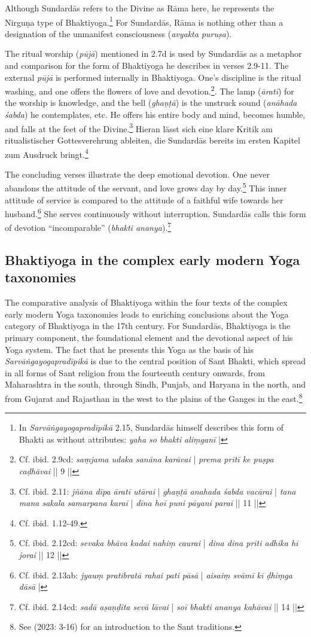 Although Sundardās refers to the Divine as Rāma here, he represents the Nirguṇa type of Bhaktiyoga.\footnote{In \textit{Sarvāṅgayogapradīpikā} 2.15, Sundardās himself describes this form of Bhakti as without attributes: \textit{yaha so bhakti aliṃganī} |} For Sundardās, Rāma is nothing other than a designation of the unmanifest consciousness (\textit{avyakta puruṣa}).

The ritual worship (\textit{pūjā}) mentioned in 2.7d is used by Sundardās as a metaphor and comparison for the form of Bhaktiyoga he describes in verses 2.9-11. The external \textit{pūjā} is performed internally in Bhaktiyoga. One's discipline is the ritual washing, and one offers the flowers of love and devotion.\footnote{Cf. ibid. 2.9cd: \textit{saṃjama udaka sanāna karāvai} | \textit{prema prītī ke puṣpa caḍhāvai} || 9 ||}. The lamp (\textit{āratī}) for the worship is knowledge, and the bell (\textit{ghaṇṭā}) is the unstruck sound (\textit{anāhada śabda}) he contemplates, etc. He offers his entire body and mind, becomes humble, and falls at the feet of the Divine.\footnote{Cf. ibid. 2.11: \textit{jñāna dīpa āratī utārai} | \textit{ghaṇṭā anahada śabda vacārai} | \textit{tana mana sakala samarpana karaī} | \textit{dīna hoī puni pāyani paraī} || 11 ||} Hieran lässt sich eine klare Kritik am ritualistischer Gottesverehrung ableiten, die Sundardās bereits im ersten Kapitel zum Ausdruck bringt.\footnote{Cf. ibid. 1.12-49.}

The concluding verses illustrate the deep emotional devotion. One never abandons the attitude of the servant, and love grows day by day.\footnote{Cf. ibid. 2.12cd: \textit{sevaka bhāva kadai nahiṃ caurai} | \textit{dina dina prīti adhika hī jorai} || 12 ||} This inner attitude of service is compared to the attitude of a faithful wife towards her husband.\footnote{Cf. ibid. 2.13ab: \textit{jyauṃ pratibratā rahai pati pāsā} | \textit{aisaiṃ svāmī kī ḍhiṃga dāsā} |} She serves continuously without interruption. Sundardās calls this form of devotion ``incomparable'' (\textit{bhakti ananya}).\footnote{Cf. ibid. 2.14cd: \textit{sadā aṣaṇḍita sevā lāvai} | \textit{soī bhakti ananya kahāvai} || 14 ||}

\subsection{Bhaktiyoga in the complex early modern Yoga taxonomies}

The comparative analysis of Bhaktiyoga within the four texts of the complex early modern Yoga taxonomies leads to enriching conclusions about the Yoga category of Bhaktiyoga in the 17th century. For Sundardās, Bhaktiyoga is the primary component, the foundational element and the devotional aspect of his Yoga system. The fact that he presents this Yoga as the basis of his \emph{Sarvāṅgayogapradīpikā} is due to the central position of Sant Bhakti, which spread in all forms of Sant religion from the fourteenth century onwards, from Maharashtra in the south, through Sindh, Punjab, and Haryana in the north, and from Gujarat and Rajasthan in the west to the plains of the Ganges in the east.\footnote{See \citeauthor{horstmann2023shrine} (2023: 3-16) for an introduction to the Sant traditions.}

